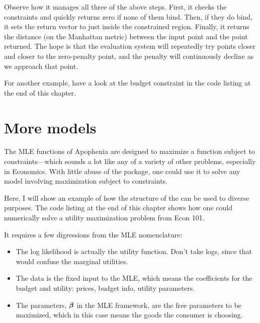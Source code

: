 Observe how it manages all three of the above steps. First, it checks
the constraints and quickly returns zero if none of them bind. Then, if
they do bind, it sets the return vector to just inside the constrained
region. Finally, it returns the distance (on the Manhattan metric)
between the input point and the point returned. The hope is that the
evaluation system will repeatedly try points closer and closer to the
zero-penalty point, and the penalty will continuously decline as we
approach that point.

For another example, have a look at the budget constraint in the code
listing at the end of this chapter.


\section{More models}    \label{econ101}

The MLE functions of Apophenia are designed to maximize a function
subject to constraints---which sounds a lot like any of a variety of
other problems, especially in Economics. With little abuse of the package,
one could use it to solve any model involving maximization
subject to constraints.  

Here, I will show an example of how the structure of the
 can be used to diverse purposes.
The code listing at the end of this
chapter shows how one could numerically solve a utility maximization
problem from Econ 101. 

It requires a few digressions from the MLE nomenclature:
\begin{itemize}
\item The log likelihood is actually the utility function. Don't take logs,
since that would confuse the marginal utilities.

\item The data is the fixed input to the MLE, which means the
coefficients for the budget and utility:
prices, budget info, utility parameters.

\item The parameters, ${\mbox{\boldmath$\beta$}}$ in the MLE framework, are the free
parameters to be maximized, which in this case means the goods the
consumer is choosing.  \end{itemize}

